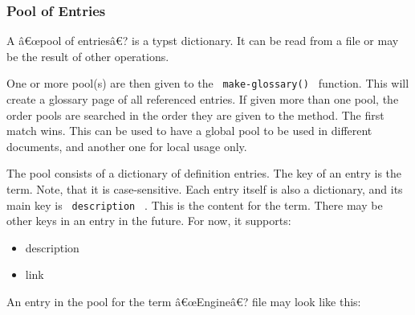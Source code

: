 \begin{Shaded}
\begin{Highlighting}[]
\NormalTok{    )}

\end{Highlighting}
\end{Shaded}

\subsubsection{Pool of Entries}\label{pool-of-entries}

A â€œpool of entriesâ€? is a typst dictionary. It can be read from a
file or may be the result of other operations.

One or more pool(s) are then given to the \texttt{\ make-glossary()\ }
function. This will create a glossary page of all referenced entries. If
given more than one pool, the order pools are searched in the order they
are given to the method. The first match wins. This can be used to have
a global pool to be used in different documents, and another one for
local usage only.

The pool consists of a dictionary of definition entries. The key of an
entry is the term. Note, that it is case-sensitive. Each entry itself is
also a dictionary, and its main key is \texttt{\ description\ } . This
is the content for the term. There may be other keys in an entry in the
future. For now, it supports:

\begin{itemize}
\tightlist
\item
  description
\item
  link
\end{itemize}

An entry in the pool for the term â€œEngineâ€? file may look like this:

\begin{Shaded}
\begin{Highlighting}[]
\NormalTok{        description: [}


\NormalTok{        ],}
\NormalTok{        link: [}


\NormalTok{        ]}
\NormalTok{    ),}
\end{Highlighting}
\end{Shaded}


